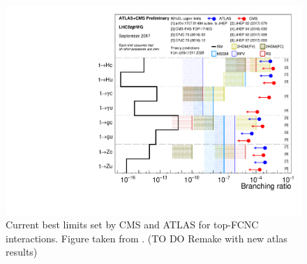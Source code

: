 \begin{figure}[htbp]
	\centering
	\includegraphics[width=0.7\linewidth]{1_Introduction/Figures/fcnc_summarybsm_sep17.pdf}
	\caption{Current best limits set by CMS and ATLAS for top-FCNC interactions.  Figure taken from \cite{summarywiki}. (TO DO Remake with new atlas results)}
	\label{fig:fcncupperlimits}
\end{figure}
